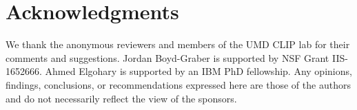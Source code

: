 \section*{Acknowledgments}
We thank the anonymous reviewers and  members of the UMD CLIP
lab for their comments and suggestions. Jordan Boyd-Graber is
supported by NSF Grant IIS- 1652666. 
Ahmed Elgohary is supported by an IBM PhD fellowship. 
Any opinions, findings, conclusions,
or recommendations expressed here are those of the authors and do not 
necessarily reflect the view of the sponsors.